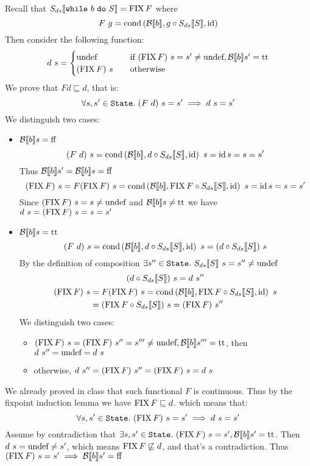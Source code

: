 \alternativeSolution
Recall that $\Sds{\wwhile{b}{S}} = \FIX F$ where
\[ F\ g= \cond{\Bool{b}}{g \circ \Sds{S}}{\id} \]
Then consider the following function:
\[
    d\ s = \begin{cases}
        \undef &\quad \text{if } (\FIX F)\ s = s' \neq \undef, \Bool{b} s' = \True \\
        (\FIX F)\ s &\quad \text{otherwise}
    \end{cases}
\]
We prove that $F d \sqsubseteq d$, that is:
\[ \forall s, s' \in \State.\ (F\ d)\ s = s' \implies d\ s = s' \]
We distinguish two cases:
\begin{itemize}
    \item $\Bool{b} s = \False$
        \[ (F\ d)\ s = \cond{\Bool{b}}{d \circ \Sds{S}}{\id}\ s = \id s = s = s' \]
        Thus $\Bool{b} s' = \Bool{b} s = \False$
        \[ (\FIX F)\ s = F(\FIX F)\ s = \cond{\Bool{b}}{\FIX F \circ \Sds{S}}{\id}\ s = \id s = s = s' \]
        Since $(\FIX F)\ s = s \neq \undef$ and $\Bool{b} s \neq \True$ we have $d\ s = (\FIX F)\ s = s = s'$
    \item $\Bool{b} s = \True$
        \[ (F\ d)\ s = \cond{\Bool{b}}{d \circ \Sds{S}}{\id}\ s = (d \circ \Sds{S})\ s \]
        By the definition of composition $\exists s'' \in \State.\ \Sds{S}\ s = s'' \neq \undef$
        \begin{gather*}
            (d \circ \Sds{S})\ s = d\ s'' \\
            \begin{aligned}
                (\FIX F)\ s &= F(\FIX F)\ s = \cond{\Bool{b}}{\FIX F \circ \Sds{S}}{\id}\ s \\
                &= (\FIX F \circ \Sds{S})\ s = (\FIX F)\ s''
            \end{aligned}
        \end{gather*}
        We distinguish two cases:
        \begin{itemize}
            \item $(\FIX F)\ s = (\FIX F)\ s'' = s''' \neq \undef, \Bool{b} s''' = \True$, then $d\ s'' = \undef = d\ s$
            \item otherwise, $d\ s'' = (\FIX F)\ s'' = (\FIX F)\ s = d\ s$
        \end{itemize}
\end{itemize}
We already proved in class that such functional $F$ is continuous.
Thus by the fixpoint induction lemma we have $\FIX F \sqsubseteq d$. which means that:
\[ \forall s, s' \in \State.\ (\FIX F)\ s = s' \implies d\ s = s' \]
Assume by contradiction that $\exists s, s' \in \State.\ (\FIX F)\ s = s', \Bool{b} s' = \True $. Then $d\ s = \undef \neq s'$, which means $\FIX F \not\sqsubseteq d$, and that's a contradiction. Thus $(\FIX F)\ s = s' \implies \Bool{b} s' = \False$